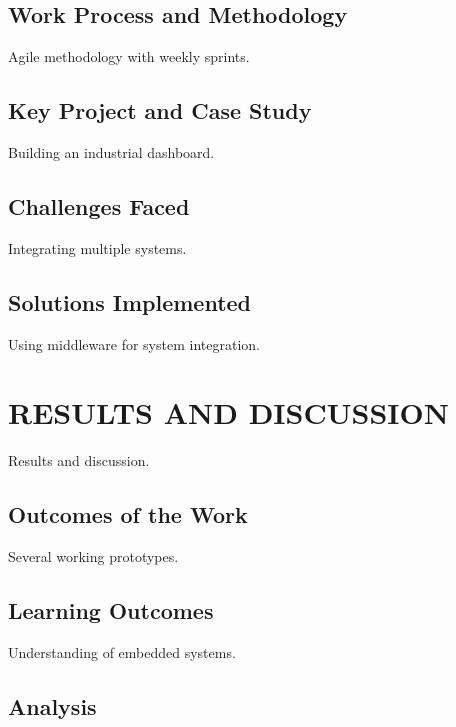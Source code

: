 \documentclass[12pt,a4paper]{report}
\begin{document}
\section{Work Process and Methodology}

Agile methodology with weekly sprints.


\section{Key Project and Case Study}

Building an industrial dashboard.




\section{Challenges Faced}

Integrating multiple systems.


\section{Solutions Implemented}

Using middleware for system integration.


\chapter{RESULTS AND DISCUSSION}
\label{ch:results}


Results and discussion.




\section{Outcomes of the Work}

Several working prototypes.


\section{Learning Outcomes}

Understanding of embedded systems.


\section{Analysis}
\end{document}
